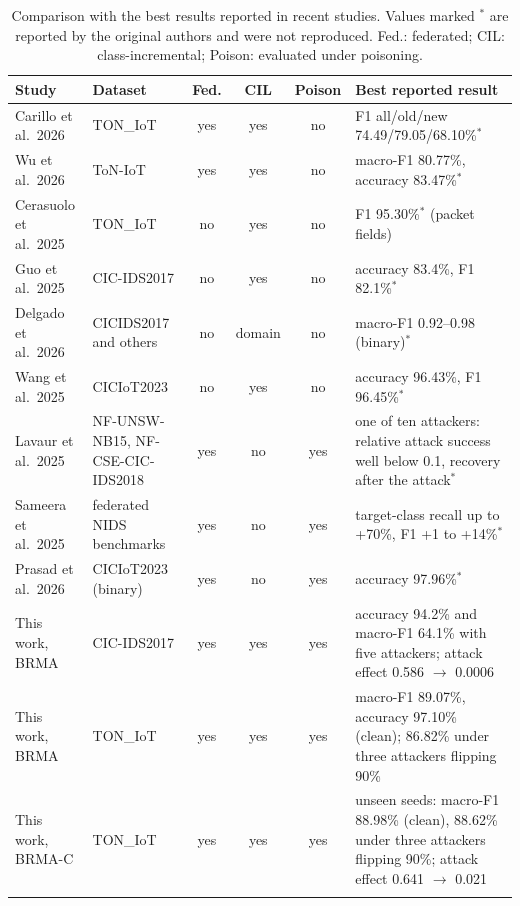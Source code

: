 \documentclass[pdflatex,sn-mathphys-num]{sn-jnl}
\theoremstyle{thmstyleone}
\theoremstyle{thmstylethree}
\begin{document}
\begin{table}[htbp]
\caption{Comparison with the best results reported in recent studies. Values marked $^\ast$ are reported by the original authors and were not reproduced. Fed.: federated; CIL: class-incremental; Poison: evaluated under poisoning.}\label{tab:sota}
\footnotesize
\begin{tabularx}{\textwidth}{@{}p{3.1cm}p{2.2cm}cccY@{}}
\toprule
Study & Dataset & Fed. & CIL & Poison & Best reported result\\
\midrule
Carillo et al.\ 2026 \cite{carillo} & TON\_IoT & yes & yes & no & F1 all/old/new 74.49/79.05/68.10\%$^\ast$\\
Wu et al.\ 2026 \cite{wu} & ToN-IoT & yes & yes & no & macro-F1 80.77\%, accuracy 83.47\%$^\ast$\\
Cerasuolo et al.\ 2025 \cite{cerasuolo} & TON\_IoT & no & yes & no & F1 95.30\%$^\ast$ (packet fields)\\
Guo et al.\ 2025 \cite{guo} & CIC-IDS2017 & no & yes & no & accuracy 83.4\%, F1 82.1\%$^\ast$\\
Delgado et al.\ 2026 \cite{delgado} & CICIDS2017 and others & no & domain & no & macro-F1 0.92--0.98 (binary)$^\ast$\\
Wang et al.\ 2025 \cite{ctwa} & CICIoT2023 & no & yes & no & accuracy 96.43\%, F1 96.45\%$^\ast$\\
Lavaur et al.\ 2025 \cite{lavaur} & NF-UNSW-NB15, NF-CSE-CIC-IDS2018 & yes & no & yes & one of ten attackers: relative attack success well below 0.1, recovery after the attack$^\ast$\\
Sameera et al.\ 2025 \cite{wei} & federated NIDS benchmarks & yes & no & yes & target-class recall up to +70\%, F1 +1 to +14\%$^\ast$\\
Prasad et al.\ 2026 \cite{prasad} & CICIoT2023 (binary) & yes & no & yes & accuracy 97.96\%$^\ast$\\
This work, BRMA & CIC-IDS2017 & yes & yes & yes & accuracy 94.2\% and macro-F1 64.1\% with five attackers; attack effect 0.586 $\to$ 0.0006\\
This work, BRMA & TON\_IoT & yes & yes & yes & macro-F1 89.07\%, accuracy 97.10\% (clean); 86.82\% under three attackers flipping 90\%\\
This work, BRMA-C & TON\_IoT & yes & yes & yes & unseen seeds: macro-F1 88.98\% (clean), 88.62\% under three attackers flipping 90\%; attack effect 0.641 $\to$ 0.021\\
\botrule
\end{tabularx}
\end{table}
\end{document}
